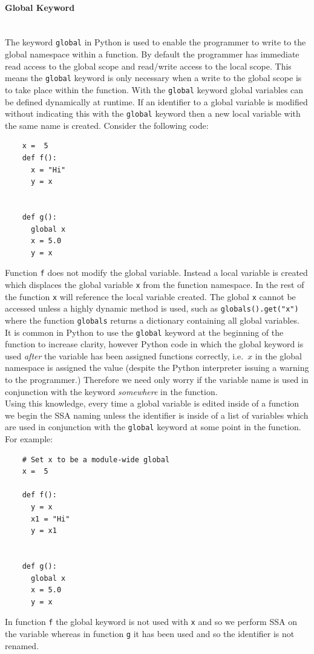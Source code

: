 \documentclass[12pt, titlepage]{article}
\begin{document}
\paragraph*{Global Keyword}\mbox{} \\
The keyword \texttt{global} in Python is used to enable the programmer to write to the global namespace within a function. By default the programmer has immediate read access to the global scope and read/write access to the local scope. This means the \texttt{global} keyword is only necessary when a write to the global scope is to take place within the function. With the \texttt{global} keyword global variables can be defined dynamically at runtime. If an identifier to a global variable is modified without indicating this with the \texttt{global} keyword then a new local variable with the same name is created. Consider the following code:
\begin{lstlisting}
    x =  5
    def f():
      x = "Hi"
      y = x
      
      
    def g():
      global x
      x = 5.0
      y = x
\end{lstlisting}
Function \texttt{f} does not modify the global variable. Instead a local variable is created which displaces the global variable \texttt{x} from the function namespace. In the rest of the function \texttt{x} will reference the local variable created. The global \texttt{x} cannot be accessed unless a highly dynamic method is used, such as \texttt{globals().get("x")} where the function \texttt{globals} returns a dictionary containing all global variables. \\
It is common in Python to use the \texttt{global} keyword at the beginning of the function to increase clarity, however Python code in which the global keyword is used \textit{after} the variable has been assigned functions correctly, i.e.\ $x$ in the global namespace is assigned the value (despite the Python interpreter issuing a warning to the programmer.) Therefore we need only worry if the variable name is used in conjunction with the keyword \textit{somewhere} in the function. \\
\indent Using this knowledge, every time a global variable is edited inside of a function we begin the SSA naming unless the identifier is inside of a list of variables which are used in conjunction with the \texttt{global} keyword at some point in the function. For example:
\begin{lstlisting}
    # Set x to be a module-wide global
    x =  5
    
    def f():
      y = x
      x1 = "Hi"
      y = x1
      
     
    def g():
      global x
      x = 5.0
      y = x
\end{lstlisting}
In function \texttt{f} the global keyword is not used with \texttt{x} and so we perform SSA on the variable whereas in function \texttt{g} it has been used and so the identifier is not renamed.
\end{document}

